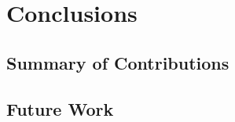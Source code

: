 \chapter{Conclusions}
\label{conclusions}

\section{Summary of Contributions}

\section{Future Work}
\label{future_work}

